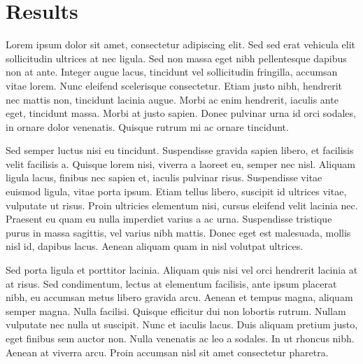 \chapter{Results}
\label{ch:results}

Lorem ipsum dolor sit amet, consectetur adipiscing elit. Sed sed erat vehicula elit sollicitudin ultrices at nec ligula. Sed non massa eget nibh pellentesque dapibus non at ante. Integer augue lacus, tincidunt vel sollicitudin fringilla, accumsan vitae lorem. Nunc eleifend scelerisque consectetur. Etiam justo nibh, hendrerit nec mattis non, tincidunt lacinia augue. Morbi ac enim hendrerit, iaculis ante eget, tincidunt massa. Morbi at justo sapien. Donec pulvinar urna id orci sodales, in ornare dolor venenatis. Quisque rutrum mi ac ornare tincidunt.

Sed semper luctus nisi eu tincidunt. Suspendisse gravida sapien libero, et facilisis velit facilisis a. Quisque lorem nisi, viverra a laoreet eu, semper nec nisl. Aliquam ligula lacus, finibus nec sapien et, iaculis pulvinar risus. Suspendisse vitae euismod ligula, vitae porta ipsum. Etiam tellus libero, suscipit id ultrices vitae, vulputate ut risus. Proin ultricies elementum nisi, cursus eleifend velit lacinia nec. Praesent eu quam eu nulla imperdiet varius a ac urna. Suspendisse tristique purus in massa sagittis, vel varius nibh mattis. Donec eget est malesuada, mollis nisl id, dapibus lacus. Aenean aliquam quam in nisl volutpat ultrices.

Sed porta ligula et porttitor lacinia. Aliquam quis nisi vel orci hendrerit lacinia at at risus. Sed condimentum, lectus at elementum facilisis, ante ipsum placerat nibh, eu accumsan metus libero gravida arcu. Aenean et tempus magna, aliquam semper magna. Nulla facilisi. Quisque efficitur dui non lobortis rutrum. Nullam vulputate nec nulla ut suscipit. Nunc et iaculis lacus. Duis aliquam pretium justo, eget finibus sem auctor non. Nulla venenatis ac leo a sodales. In ut rhoncus nibh. Aenean at viverra arcu. Proin accumsan nisl sit amet consectetur pharetra.